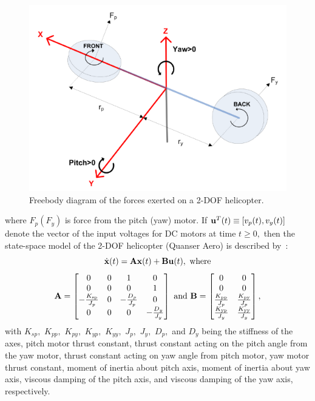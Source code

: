 \begin{figure}[!htbp]
 \begin{center}
  \includegraphics[scale=.75]{figs/img/helicopterModel.png}
 \end{center}
 \caption{Freebody diagram of the forces exerted on a 2-DOF helicopter.}
 \label{fig:helicopterModel}
\end{figure}

where $F_p(F_y)$ is force from the pitch (yaw) motor. If ${\bf u}^T(t)  \equiv [v_p(t),v_y(t)]$ denote the vector of the input voltages for DC motors at time $t\ge 0,$ then the state-space model of the 2-DOF helicopter (Quanser Aero) is described by~\cite{FaBiMi2018-c1}:
%
\begin{equation}
  \dot{\bf x}(t) = {\bf A}{\bf x}(t) +{\bf B}{\bf u}(t),~\mathrm{where}
\label{eq:stateModel}
\end{equation}  
%
\begin{equation}
{\bf A} =  
\begin{bmatrix}
0 & 0 & 1 & 0\\
0 & 0 & 0 & 1\\
-\frac{K_{\text{sp}}}{J_p} & 0 & -\frac{D_p}{J_p} &  0\\
0 & 0 & 0 & -\frac{D_y}{J_y}    
\end{bmatrix}
~\text{and}~
  {\bf B} =
\begin{bmatrix}
0 & 0\\
0 & 0\\
\frac{K_{\text{pp}}}{J_p} & \frac{K_{\text{py}}}{J_p}\\
\frac{K_{\text{yp}}}{J_y} & \frac{K_{\text{yy}}}{J_y}                           
\end{bmatrix},
\end{equation}
%
with $K_{sp},$ $K_{pp},$ $K_{py},$ $K_{yp},$ $K_{yy},$ $J_p,$ $J_y,$ $D_p,$ and $D_y$ being the stiffness of the axes, pitch motor thrust constant, thrust constant acting on the pitch angle from the yaw motor, thrust constant acting on yaw angle from pitch motor, yaw motor thrust constant, moment of inertia about pitch axis, moment of inertia about yaw axis, viscous damping of the pitch axis, and viscous damping of the yaw axis, respectively.

